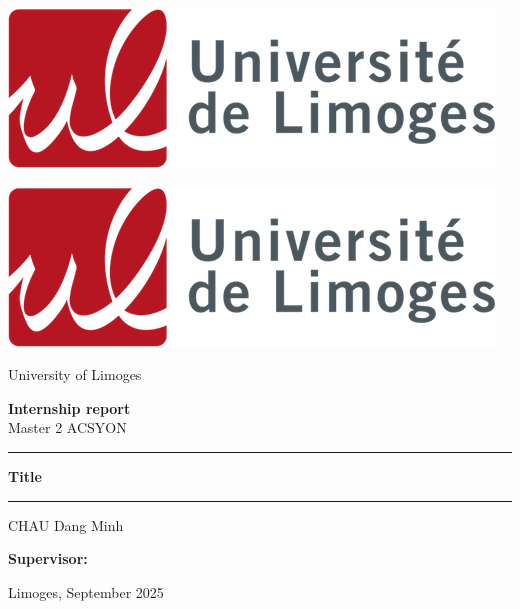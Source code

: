 \begin{titlepage}
  \begin{center}
    \begin{minipage}{0.45\textwidth}
      \centering
      \includegraphics[width=0.8\linewidth]{logo-unilim.png}
    \end{minipage}
    \hfill
    \begin{minipage}{0.45\textwidth}
      \centering
      \includegraphics[width=0.8\linewidth]{logo-unilim.png}
    \end{minipage}

    \vspace{1cm}

    \Large
    University of Limoges\\
    \vspace{0.5cm}

    \large
    \textbf{Internship report}\\
    Master 2 ACSYON

    \vspace{1.5cm}

    \noindent\rule{\textwidth}{0.4pt}
    \vspace{0.5cm}

    \Large
    \textbf{Title}

    \vspace{0.5cm}
    \noindent\rule{\textwidth}{0.4pt}

    \vfill

    CHAU Dang Minh

    \vfill

    \Large
    \textbf{Supervisor:}

    \vfill

    \large
    Limoges, September 2025

  \end{center}
\end{titlepage}
